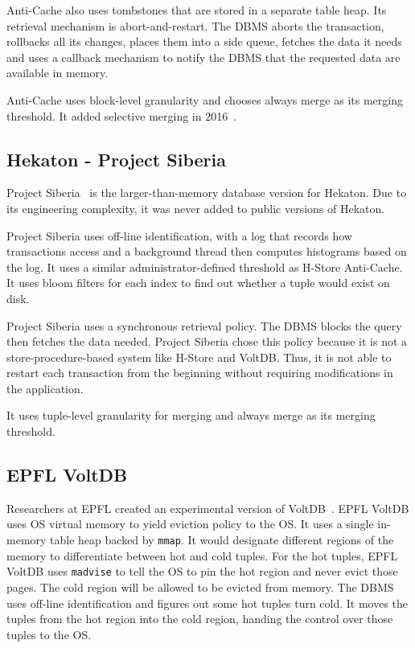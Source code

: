 \documentclass[11pt]{article}
\begin{document}
Anti-Cache also uses tombstones that are stored in a separate table heap. Its retrieval mechanism is abort-and-restart. The DBMS aborts the transaction, rollbacks all its changes, places them into a side queue, fetches the data it needs and uses a callback mechanism to notify the DBMS that the requested data are available in memory. 

Anti-Cache uses block-level granularity and chooses always merge as its merging threshold. It added selective merging in 2016~\cite{DeBrabant:2013}.

\subsection*{Hekaton - Project Siberia}
Project Siberia~\cite{Eldawy:2014} is the larger-than-memory database version for Hekaton. Due to its engineering complexity, it was never added to public versions of Hekaton.

Project Siberia uses off-line identification, with a log that records how transactions access and a background thread then computes histograms based on the log. It uses a similar administrator-defined threshold as H-Store Anti-Cache. It uses bloom filters for each index to find out whether a tuple would exist on disk.

Project Siberia uses a synchronous retrieval policy. The DBMS blocks the query then fetches the data needed. Project Siberia chose this policy because it is not a store-procedure-based system like H-Store and VoltDB. Thus, it is not able to restart each transaction from the beginning without requiring modifications in the application.

It uses tuple-level granularity for merging and always merge as its merging threshold.

\subsection*{EPFL VoltDB}
Researchers at EPFL created an experimental version of VoltDB~\cite{Stoica:2013}. EPFL VoltDB uses OS virtual memory to yield eviction policy to the OS. It uses a single in-memory table heap backed by \texttt{mmap}. It would designate different regions of the memory to differentiate between hot and cold tuples. For the hot tuples, EPFL VoltDB uses \texttt{madvise} to tell the OS to pin the hot region and never evict those pages. The cold region will be allowed to be evicted from memory. The DBMS uses off-line identification and figures out some hot tuples turn cold. It moves the tuples from the hot region into the cold region, handing the control over those tuples to the OS.
\end{document}
